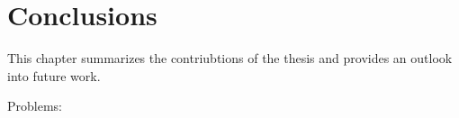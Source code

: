 \chapter{Conclusions\label{cha:chapter6}}

This chapter summarizes the contriubtions of the thesis and provides an outlook into future work. 

Problems:
